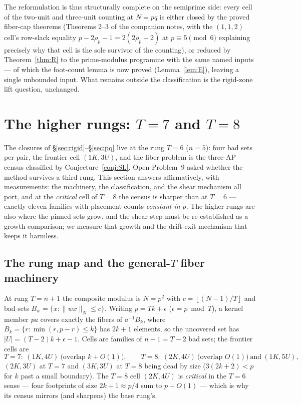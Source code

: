 \documentclass[11pt,a4paper]{article}
\numberwithin{equation}{section}
\theoremstyle{plain}
\theoremstyle{plain}
\theoremstyle{definition}
\theoremstyle{remark}
\newcommand{\floor}[1]{\left\lfloor #1 \right\rfloor}
\newcommand{\wn}[1]{\lVert #1 \rVert_{N}}
\begin{document}
The reformulation is thus structurally complete on the semiprime side: every
cell of the two-unit and three-unit counting at $N=pq$ is either closed by
the proved fiber-cap theorems (Theorems 2--3 of the companion notes, with the
$(1,1,2)$ cell's row-slack equality $p-2\rho_p-1=2(2\rho_p+2)$ at
$p\equiv5\pmod6$ explaining precisely why that cell is the sole survivor of
the counting), or reduced by Theorem~\ref{thm:R} to the prime-modulus
programme with the same named inputs --- of which the foot-count lemma is
now proved (Lemma~\ref{lem:E}), leaving a single unbounded input. What
remains outside the
classification is the rigid-zone lift question, unchanged.


\section{The higher rungs: $T=7$ and $T=8$}\label{sec:higherrung}

The closures of \S\ref{sec:rigid}--\S\ref{sec:pq} live at the rung $T=6$
($n=5$): four bad sets per pair, the frontier cell $(1K,3U)$, and the
fiber problem is the three-AP census classified by Conjecture~\ref{conj:SL}.
Open Problem~9 asked whether the method survives a third rung. This
section answers affirmatively, with measurements: the machinery, the
classification, and the shear mechanism all port, and at the \emph{critical}
cell of $T=8$ the census is sharper than at $T=6$ --- exactly eleven
families with placement counts \emph{constant in $p$}. The higher rungs
are also where the pinned sets grow, and the shear step must be
re-established as a growth comparison; we measure that growth and the
drift-exit mechanism that keeps it harmless.

\subsection{The rung map and the general-\texorpdfstring{$T$}{T} fiber machinery}

At rung $T=n+1$ the composite modulus is $N=p^2$ with $c=\floor{(N-1)/T}$
and bad sets $B_w=\{x:\wn{wx}\le c\}$. Writing $p=Tk+\epsilon$
($\epsilon=p\bmod T$), a kernel member $pa$ covers exactly the fibers of
$a^{-1}B_k$, where $B_k=\{r:\min(r,p-r)\le k\}$ has $2k+1$ elements, so
the uncovered set has $|U|=(T-2)k+\epsilon-1$. Cells are families of
$n-1=T-2$ bad sets; the frontier cells are
\[
T=7:\ (1K,4U)\ \text{(overlap }k+O(1)\text{)},\qquad
T=8:\ (2K,4U)\ \text{(overlap }O(1)\text{)}\ \text{and}\ (1K,5U),
\]
$(2K,3U)$ at $T=7$ and $(3K,3U)$ at $T=8$ being dead by size
($3(2k+2)<p$ for $k$ past a small boundary). The $T=8$ cell $(2K,4U)$ is
\emph{critical} in the $T=6$ sense --- four footprints of size
$2k+1\approx p/4$ sum to $p+O(1)$ --- which is why its census mirrors
(and sharpens) the base rung's.
\end{document}
